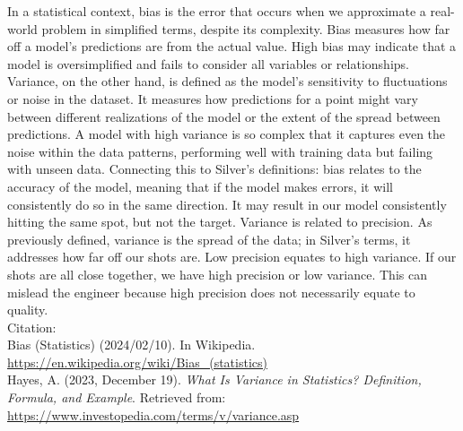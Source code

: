 \documentclass[12pt]{article}
\begin{document}
\begin{enumerate}
In a statistical context, bias is the error that occurs when we approximate a real-world problem in simplified terms, despite its complexity. Bias measures how far off a model's predictions are from the actual value. High bias may indicate that a model is oversimplified and fails to consider all variables or relationships. Variance, on the other hand, is defined as the model's sensitivity to fluctuations or noise in the dataset. It measures how predictions for a point might vary between different realizations of the model or the extent of the spread between predictions. A model with high variance is so complex that it captures even the noise within the data patterns, performing well with training data but failing with unseen data. Connecting this to Silver's definitions: bias relates to the accuracy of the model, meaning that if the model makes errors, it will consistently do so in the same direction. It may result in our model consistently hitting the same spot, but not the target. Variance is related to precision. As previously defined, variance is the spread of the data; in Silver's terms, it addresses how far off our shots are. Low precision equates to high variance. If our shots are all close together, we have high precision or low variance. This can mislead the engineer because high precision does not necessarily equate to quality. \\
Citation: \\
Bias (Statistics) (2024/02/10). In Wikipedia. \url{https://en.wikipedia.org/wiki/Bias\_(statistics)} \\ 

Hayes, A. (2023, December 19). \textit{What Is Variance in Statistics? Definition, Formula, and Example}. Retrieved from: \url{https://www.investopedia.com/terms/v/variance.asp}
\end{enumerate}


\end{document}
